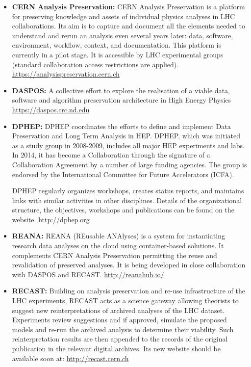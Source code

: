 \begin{itemize}
\item
  \textbf{CERN Analysis Preservation:} CERN Analysis Preservation is a
  platform for preserving knowledge and assets of individual physics
  analyses in LHC collaborations. Its aim is to capture and document all
  the elements needed to understand and rerun an analysis even several
  years later: data, software, environment, workflow, context, and
  documentation. This platform is currently in a pilot stage. It is
  accessible by LHC experimental groups (standard collaboration access
  restrictions are applied). \url{https://analysispreservation.cern.ch}
\item
  \textbf{DASPOS:} A collective effort to explore the realisation of a
  viable data, software and algorithm preservation architecture in High
  Energy Physics \url{https://daspos.crc.nd.edu}
\item
  \textbf{DPHEP:} DPHEP coordinates the efforts to define and implement
  Data Preservation and Long Term Analysis in HEP. DPHEP, which was
  initiated as a study group in 2008-2009, includes all major HEP
  experiments and labs. In 2014, it has become a Collaboration through
  the signature of a Collaboration Agreement by a number of large
  funding agencies. The group is endorsed by the International Committee
  for Future Accelerators (ICFA).

  DPHEP regularly organizes workshops, creates status reports, and
  maintains links with similar activities in other disciplines. Details
  of the organizational structure, the objectives, workshops and
  publications can be found on the website. \url{http://dphep.org}
\item
  \textbf{REANA:} REANA (REusable ANAlyses) is a system for
  instantiating research data analyses on the cloud using
  container-based solutions. It complements CERN Analysis Preservation
  permitting the reuse and revalidation of preserved analyses. It is
  being developed in close collaboration with DASPOS and RECAST.
  \url{http://reanahub.io/}
\item
  \textbf{RECAST:} Building on analysis preservation and re-use
  infrastructure of the LHC experiments, RECAST acts as a science
  gateway allowing theorists to suggest new reinterpretations of
  archived analyses of the LHC dataset. Experiments review suggestions
  and if approved, simulate the proposed models and re-run the archived
  analysis to determine their viability. Such reinterpretation results
  are then appended to the records of the original publication in the
  relevant digital archives. Its new website should be available soon
  at: \url{http://recast.cern.ch}
\end{itemize}

